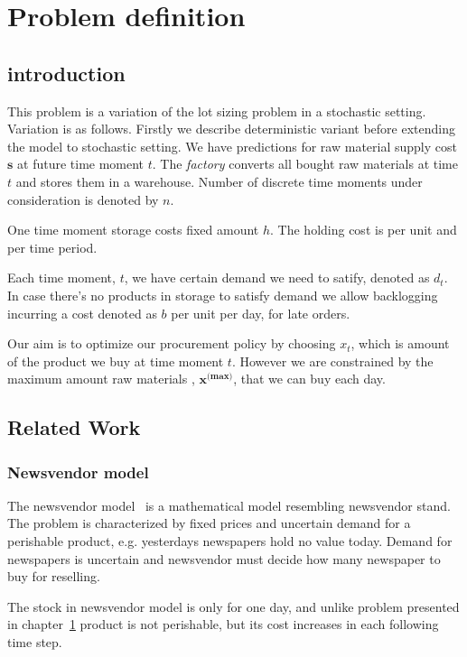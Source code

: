 
\chapter{Problem definition}
\label{chap:prob-def}
\section{introduction}

This problem is a variation of the lot sizing problem in a stochastic setting. Variation is as follows. Firstly we describe deterministic variant before extending the model to stochastic setting. We have predictions for raw material supply cost $\mathbf{s}$ at future time moment $t$. The \emph{factory} converts all bought raw materials at time $t$ and stores them in a warehouse. Number of discrete time moments under consideration is denoted by $n$.

One time moment storage costs fixed amount $h$. The  holding cost is per unit and per time period.

Each time moment, $t$, we have certain demand we need to satify, denoted as $d_t$. In case there's no products in storage to satisfy demand we allow backlogging incurring a cost denoted as $b$ per unit per day, for late orders.

Our aim is to optimize our procurement policy by choosing $x_t$, which is amount of the product we buy at time moment $t$. However we are constrained by the maximum amount raw materials , $\mathbf{x^{\text{(max)}}}$, that we can buy each day.

\section{Related Work}

\subsection{Newsvendor model}
\label{sec:Newsvendor model}

The newsvendor model~\cite{Arrow1974} is a mathematical model resembling newsvendor stand. The problem is characterized by fixed prices and uncertain demand for a perishable product, e.g. yesterdays newspapers hold no value today. Demand for newspapers is uncertain and newsvendor must decide how many newspaper to buy for reselling.


The stock in newsvendor model is only for one day, and unlike problem presented in chapter~\ref{chap:prob-def} product is not perishable, but its cost increases in each following time step.

